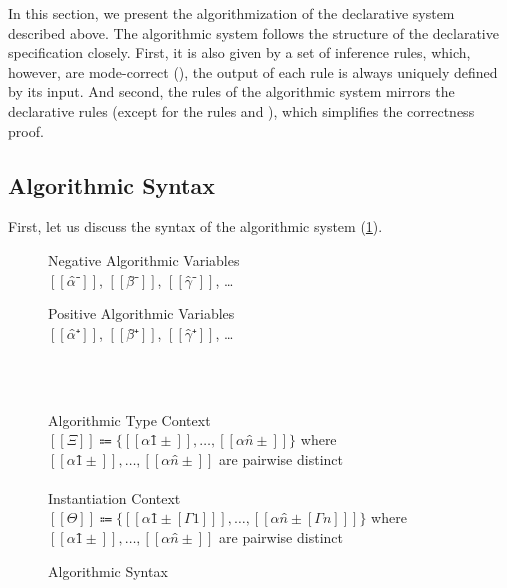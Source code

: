 \label{sec:algorithm}

In this section, we present the algorithmization of the declarative system described above.
The algorithmic system follows the structure of the declarative specification closely.
First, it is also given by a set of inference rules, which, however,
are mode-correct (\cite{dunfield2020:bidirectional}), \ie
the output of each rule is always uniquely defined by its input.
And second, the rules of the algorithmic system mirrors the declarative rules 
(except for the rules  and ), 
which simplifies the correctness proof. 


\subsection{Algorithmic Syntax}
\label{sec:algo-syntax}

First, let us discuss the syntax of the algorithmic system (\cref{fig:algo-syntax}).

\begin{figure}[t]

  \begin{minipage}[t]{0.49\textwidth}
      Negative Algorithmic Variables\\
      $[[α̂⁻]]$, $[[β̂⁻]]$, $[[γ̂⁻]]$, \dots\\
  \end{minipage}%
  \begin{minipage}[t]{0.49\textwidth}
      Positive Algorithmic Variables\\
      $[[α̂⁺]]$, $[[β̂⁺]]$, $[[γ̂⁺]]$, \dots\\
  \end{minipage}

  \hfill\\
  \begin{minipage}[t]{0.49\textwidth}
      \ottuNShort
  \end{minipage}
  \begin{minipage}[t]{0.49\textwidth}
      \ottuPShort
  \end{minipage}
  \hfill\\
  Algorithmic Type Context\\
   $[[Ξ]] \Coloneqq \{[[α1̂±]], \dots, [[αn̂±]]\}$ where $[[α1̂±]], \dots, [[αn̂±]]$ are pairwise distinct \\
  \hfill\\
  Instantiation Context\\
   $[[Θ]] \Coloneqq \{[[ α1̂±[Γ1] ]], \dots, [[ αn̂±[Γn] ]]\}$ where $[[α1̂±]], \dots, [[αn̂±]]$ are pairwise distinct \\
  \caption{Algorithmic Syntax}
  \label{fig:algo-syntax}
\end{figure}


